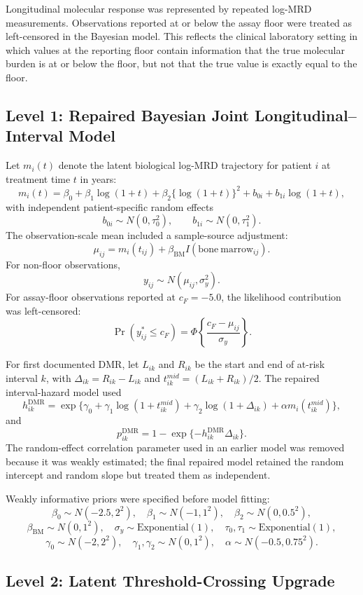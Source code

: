 \documentclass[11pt]{article}
\begin{document}
Longitudinal molecular response was represented by repeated log-MRD measurements. Observations reported at or below the assay floor were treated as left-censored in the Bayesian model. This reflects the clinical laboratory setting in which values at the reporting floor contain information that the true molecular burden is at or below the floor, but not that the true value is exactly equal to the floor.

\subsection{Level 1: Repaired Bayesian Joint Longitudinal--Interval Model}

Let \(m_i(t)\) denote the latent biological log-MRD trajectory for patient \(i\) at treatment time \(t\) in years:
\[
m_i(t)=\beta_0+\beta_1\log(1+t)+\beta_2\{\log(1+t)\}^2
+b_{0i}+b_{1i}\log(1+t),
\]
with independent patient-specific random effects
\[
b_{0i}\sim N(0,\tau_0^2), \qquad b_{1i}\sim N(0,\tau_1^2).
\]
The observation-scale mean included a sample-source adjustment:
\[
\mu_{ij}=m_i(t_{ij})+\beta_{\mathrm{BM}}I(\mathrm{bone\ marrow}_{ij}).
\]
For non-floor observations,
\[
y_{ij}\sim N(\mu_{ij},\sigma_y^2).
\]
For assay-floor observations reported at \(c_F=-5.0\), the likelihood contribution was left-censored:
\[
\Pr(y_{ij}^{\ast}\le c_F)=
\Phi\left\{\frac{c_F-\mu_{ij}}{\sigma_y}\right\}.
\]

For first documented DMR, let \(L_{ik}\) and \(R_{ik}\) be the start and end of at-risk interval \(k\), with \(\Delta_{ik}=R_{ik}-L_{ik}\) and \(t_{ik}^{mid}=(L_{ik}+R_{ik})/2\). The repaired interval-hazard model used
\[
h_{ik}^{\mathrm{DMR}}=
\exp\{\gamma_0+\gamma_1\log(1+t_{ik}^{mid})
+\gamma_2\log(1+\Delta_{ik})
+\alpha m_i(t_{ik}^{mid})\},
\]
and
\[
p_{ik}^{\mathrm{DMR}}=
1-\exp\{-h_{ik}^{\mathrm{DMR}}\Delta_{ik}\}.
\]
The random-effect correlation parameter used in an earlier model was removed because it was weakly estimated; the final repaired model retained the random intercept and random slope but treated them as independent.

Weakly informative priors were specified before model fitting:
\[
\beta_0\sim N(-2.5,2^2),\quad
\beta_1\sim N(-1,1^2),\quad
\beta_2\sim N(0,0.5^2),
\]
\[
\beta_{\mathrm{BM}}\sim N(0,1^2),\quad
\sigma_y\sim \mathrm{Exponential}(1),\quad
\tau_0,\tau_1\sim \mathrm{Exponential}(1),
\]
\[
\gamma_0\sim N(-2,2^2),\quad
\gamma_1,\gamma_2\sim N(0,1^2),\quad
\alpha\sim N(-0.5,0.75^2).
\]

\subsection{Level 2: Latent Threshold-Crossing Upgrade}
\end{document}
